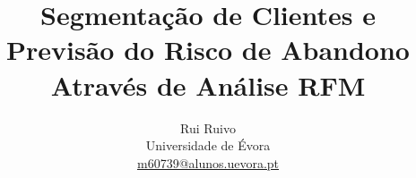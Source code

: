 \documentclass{easychair}
\begin{document}
\raggedbottom

\title{Segmentação de Clientes e Previsão do Risco de Abandono Através de Análise RFM}

\titlerunning{}

%

\author{Rui Ruivo\\
Universidade de Évora\\
\url{m60739@alunos.uevora.pt}\\
}


\maketitle
\end{document}
